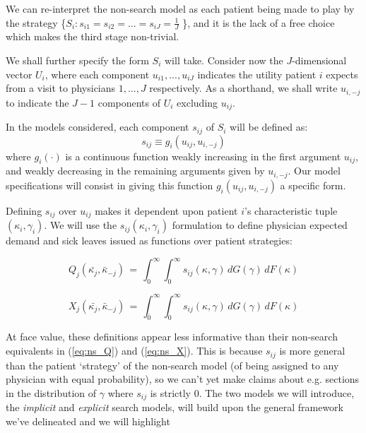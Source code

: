\documentclass[../main.tex]{subfiles}
\begin{document}
We can re-interpret the non-search model as each patient being made to play by the strategy \{$S_i: s_{i1} = s_{i2} = ... = s_{iJ} = \frac{1}{J}$ \}, and it is the lack of a free choice which makes the third stage non-trivial.

We shall further specify the form $S_i$ will take. Consider now the $J$-dimensional vector $U_i$, where each component $u_{i1}, ... , u_{iJ}$ indicates the utility patient $i$ expects from a visit to physicians $1, ..., J$ respectively. As a shorthand, we shall write $u_{i,-j}$ to indicate the $J - 1$ components of $U_i$ excluding $u_{ij}$.

In the models considered, each component $s_{ij}$ of $S_i$ will be defined as:
\[s_{ij} \equiv g_i(u_{ij}, u_{i,-j})\]
where $g_i(\cdot)$ is a continuous function weakly increasing in the first argument $u_{ij}$, and weakly decreasing in the remaining arguments given by $u_{i,-j}$. Our model specifications will consist in giving this function $g_i(u_{ij}, u_{i,-j})$ a specific form.

Defining $s_{ij}$ over $u_{ij}$ makes it dependent upon patient $i$'s characteristic tuple $(\kappa_i, \gamma_i)$. We will use the $s_{ij}(\kappa_i, \gamma_i)$ formulation to define physician expected demand and sick leaves issued as functions over patient strategies:

\begin{equation}
    Q_j(\bar{\kappa_j}, \bar{\kappa}_{-j}) \,=\, \int_{0}^{\infty} \int_{0}^{\infty}s_{ij}(\kappa, \gamma) \,dG(\gamma) \,dF(\kappa)
    \label{eq:s_Q}
\end{equation}

\begin{equation}
    X_j(\bar{\kappa_j}, \bar{\kappa}_{-j}) \,=\, \int_{\bar{0}}^{\infty} \int_{0}^{\infty}s_{ij}(\kappa, \gamma)  \,dG(\gamma) \,dF(\kappa)
    \label{eq:s_X}
\end{equation}

At face value, these definitions appear less informative than their non-search equivalents in (\ref{eq:ns_Q}) and (\ref{eq:ns_X}). This is because $s_{ij}$ is more general than the patient `strategy' of the non-search model (of being assigned to any physician with equal probability), so we can't yet make claims about e.g. sections in the distribution of $\gamma$ where $s_{ij}$ is strictly 0. The two models we will introduce, the \textit{implicit} and \textit{explicit} search models, will build upon the general framework we've delineated and we will highlight
\end{document}
